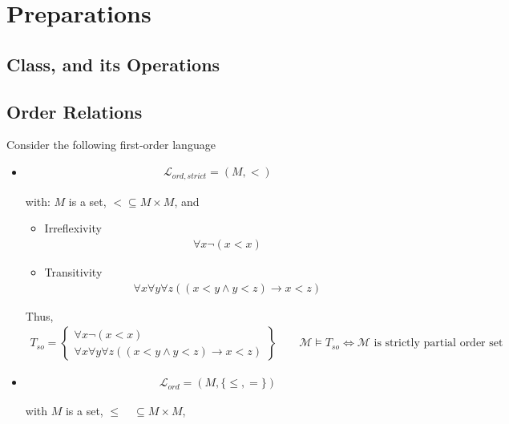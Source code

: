 \documentclass[Total.tex]{subfiles}
\begin{document}
	\chapter{Preparations}
		\section{Class, and its Operations}
		\section{Order Relations}
			\begin{Def}
				Consider the following first-order language
				\begin{itemize}
					\item 
					\begin{gather*}
						\mathcal{L}_{ord,strict}=(M,<)
					\end{gather*}
					
					with: $M$ is a set, $<\subseteq M\times M$, and 
					\begin{itemize}
						\item Irreflexivity
						\begin{gather*}
							\forall x \neg(x<x)
						\end{gather*}
						\item Transitivity
						\begin{gather*}
							\forall x\forall y\forall z((x<y\wedge y<z)\rightarrow x<z)
						\end{gather*}
					\end{itemize}
					
					Thus, 
					\begin{gather*}
						T_{so}=\begin{Bmatrix}
							\forall x \neg(x<x)\\
							\forall x\forall y\forall z((x<y\wedge y<z)\rightarrow x<z)
						\end{Bmatrix}\qquad \mathcal{M}\models T_{so}\Leftrightarrow \mathcal{M}\mbox{ is strictly partial order set}
					\end{gather*}
					
					\item 
					\begin{gather*}
						\mathcal{L}_{ord}=(M,\{\leq,=\})
					\end{gather*}
					
					with $M$ is a set, $\leq \quad\subseteq M\times M$, 
					\begin{itemize}
						

\end{itemize}
\end{itemize}
\end{Def}
\end{document}
